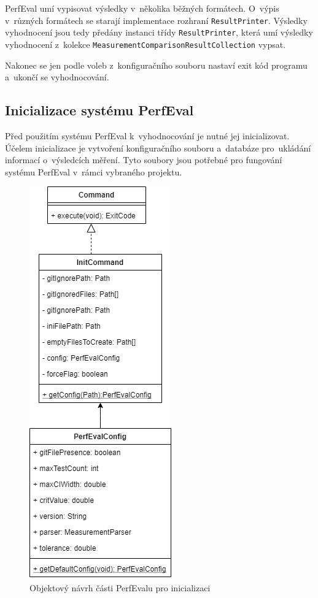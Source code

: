 PerfEval umí vypisovat výsledky v~několika běžných formátech. O~výpis v~různých formátech se starají implementace rozhraní
\lstinline|ResultPrinter|. Výsledky vyhodnocení jsou tedy předány instanci třídy \lstinline|ResultPrinter|, která
umí výsledky vyhodnocení z~kolekce \lstinline|MeasurementComparisonResultCollection| vypsat.

Nakonec se jen podle voleb z~konfiguračního souboru nastaví exit kód programu a~ukončí se vyhodnocování.

\subsection{Inicializace systému PerfEval}

Před použitím systému PerfEval k~vyhodnocování je nutné jej inicializovat.
Účelem inicializace je vytvoření konfiguračního souboru a~databáze pro~ukládání informací o~výsledcích měření.
Tyto soubory jsou potřebné pro fungování systému PerfEval v~rámci vybraného projektu.

\begin{figure}[!ht]
    \centering
    \includegraphics[height=0.47\textheight]{../img/perfeval_init.png}
    \caption{Objektový návrh části PerfEvalu pro inicializaci}
\end{figure}

